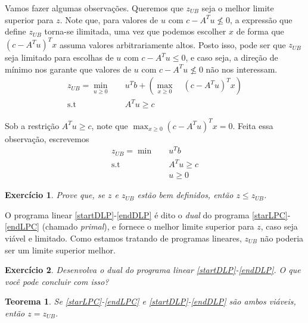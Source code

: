 \documentclass[]{article}
\newtheorem{teorema}{Teorema}
\newtheorem{exercicio}{Exercício}
\numberwithin{equation}{section}
\begin{document}
Vamos fazer algumas observações.
Queremos que $z_{UB}$ seja o melhor limite superior para $z$.
Note que, para valores de $u$ com $c - A^Tu \not\leq 0$, a expressão que define $z_{UB}$ torna-se
ilimitada, uma vez que podemos escolher $x$ de forma que $(c - A^Tu)^Tx$ assuma valores arbitrariamente
altos.
Posto isso, pode ser que $z_{UB}$ seja limitado para escolhas de $u$ com $c - A^Tu \leq 0$, e caso seja,
a direção de mínimo nos garante que valores de $u$ com $c - A^Tu \not\leq 0$ não nos interessam.
\begin{align}
z_{UB} =  \min_{u \geq 0} &\quad  u^Tb +
          \left( \max_{x \geq 0} \quad (c - A^Tu)^Tx \right) \\
          \text{s.t}      &\quad  A^Tu \geq c
\end{align}

Sob a restrição $A^Tu \geq c$, note que $\max_{x \geq 0} (c - A^Tu)^Tx = 0$.
Feita essa observação, escrevemos
\begin{align}
z_{UB} =  \min        &\quad  u^Tb        \label{startDLP} \\
          \text{s.t}  &\quad  A^Tu \geq c                  \\
                      &\quad  u \geq 0    \label{endDLP}
\end{align}

\begin{exercicio} \label{exercicioWeakDuality}
  Prove que, se $z$ e $z_{UB}$ estão bem definidos, então $z \leq z_{UB}$.
\end{exercicio}

O programa linear \eqref{startDLP}-\eqref{endDLP} é dito o \emph{dual} do programa
\eqref{starLPC}-\eqref{endLPC} (chamado \emph{primal}), e fornece o melhor limite superior para $z$, caso seja viável e
limitado.
Como estamos tratando de programas lineares, $z_{UB}$ não poderia ser um limite superior melhor.

\begin{exercicio}
  Desenvolva o dual do programa linear \eqref{startDLP}-\eqref{endDLP}.
  O que você pode concluir com isso?
\end{exercicio}

\begin{teorema}
  Se \eqref{starLPC}-\eqref{endLPC} e \eqref{startDLP}-\eqref{endDLP} são ambos viáveis, então
  $z = z_{UB}$.
\end{teorema}
\end{document}
